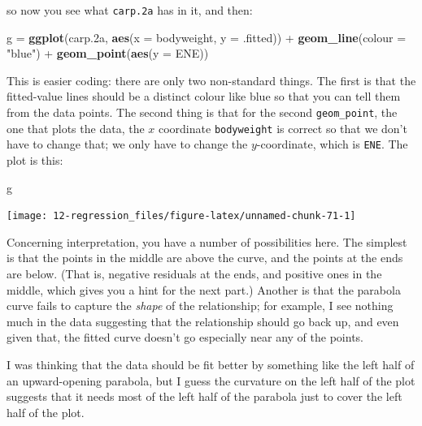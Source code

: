\documentclass[]{tufte-book}
\newenvironment{Shaded}{}{}
\newcommand{\DataTypeTok}[1]{\textcolor[rgb]{0.56,0.13,0.00}{#1}}
\newcommand{\FloatTok}[1]{\textcolor[rgb]{0.25,0.63,0.44}{#1}}
\newcommand{\KeywordTok}[1]{\textcolor[rgb]{0.00,0.44,0.13}{\textbf{#1}}}
\newcommand{\NormalTok}[1]{#1}
\newcommand{\OperatorTok}[1]{\textcolor[rgb]{0.40,0.40,0.40}{#1}}
\newcommand{\StringTok}[1]{\textcolor[rgb]{0.25,0.44,0.63}{#1}}
\theoremstyle{definition}
\theoremstyle{definition}
\theoremstyle{definition}
\theoremstyle{remark}
\begin{document}
so now you see what \texttt{carp.2a} has in it, and then:

\begin{Shaded}
\begin{Highlighting}[]
\NormalTok{g =}\StringTok{ }\KeywordTok{ggplot}\NormalTok{(carp}\FloatTok{.2}\NormalTok{a, }\KeywordTok{aes}\NormalTok{(}\DataTypeTok{x =}\NormalTok{ bodyweight, }\DataTypeTok{y =}\NormalTok{ .fitted)) }\OperatorTok{+}\StringTok{ }
\StringTok{    }\KeywordTok{geom_line}\NormalTok{(}\DataTypeTok{colour =} \StringTok{"blue"}\NormalTok{) }\OperatorTok{+}\StringTok{ }\KeywordTok{geom_point}\NormalTok{(}\KeywordTok{aes}\NormalTok{(}\DataTypeTok{y =}\NormalTok{ ENE))}
\end{Highlighting}
\end{Shaded}

This is easier coding: there are only two non-standard things. The first
is that the fitted-value lines should be a distinct colour like blue so
that you can tell them from the data points. The second thing is that
for the second \texttt{geom\_point}, the one that plots the data, the
\(x\) coordinate \texttt{bodyweight} is correct so that we don't have to
change that; we only have to change the \(y\)-coordinate, which is
\texttt{ENE}. The plot is this:

\begin{Shaded}
\begin{Highlighting}[]
\NormalTok{g}
\end{Highlighting}
\end{Shaded}

\texttt{[image: 12-regression\_files/figure-latex/unnamed-chunk-71-1]}

Concerning interpretation, you have a number of possibilities here. The
simplest is that the points in the middle are above the curve, and the
points at the ends are below. (That is, negative residuals at the ends,
and positive ones in the middle, which gives you a hint for the next
part.) Another is that the parabola curve fails to capture the
\emph{shape} of the relationship; for example, I see nothing much in the
data suggesting that the relationship should go back up, and even given
that, the fitted curve doesn't go especially near any of the points.

I was thinking that the data should be fit better by something like the
left half of an upward-opening parabola, but I guess the curvature on
the left half of the plot suggests that it needs most of the left half
of the parabola just to cover the left half of the plot.
\end{document}
